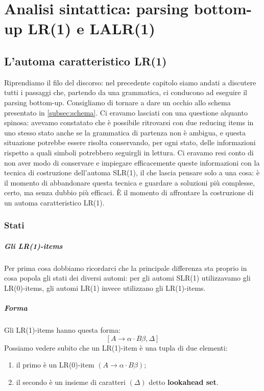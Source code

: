 \documentclass[class=book, crop=false, oneside, 12pt]{standalone}
\begin{document}
\chapter[Parsing bottom-up: LR(1) e LALR(1)]{Analisi sintattica: parsing bottom-up LR(1) e LALR(1)}

\section{L'automa caratteristico LR(1)}
Riprendiamo il filo del discorso: nel precedente capitolo siamo andati a discutere tutti i passaggi che, partendo da una grammatica, ci conducono ad eseguire il parsing bottom-up. Consigliamo di tornare a dare un occhio allo schema presentato in \autoref{subsec:schema}. Ci eravamo lasciati con una questione alquanto spinosa: avevamo constatato che è possibile ritrovarsi con due reducing items in uno stesso stato anche se la grammatica di partenza non è ambigua, e questa situazione potrebbe essere risolta conservando, per ogni stato, delle informazioni rispetto a quali simboli potrebbero seguirgli in lettura. Ci eravamo resi conto di non aver modo di conservare e impiegare efficacemente queste informazioni con la tecnica di costruzione dell'automa SLR(1), il che lascia pensare solo a una cosa: è il momento di abbandonare questa tecnica e guardare a soluzioni più complesse, certo, ma senza dubbio più efficaci. È il momento di affrontare la costruzione di un automa caratteristico LR(1).
\subsection{Stati}
\paragraph{Gli LR(1)-items}
Per prima cosa dobbiamo ricordarci che la principale differenza sta proprio in cosa popola gli stati dei diversi automi: per gli automi SLR(1) utilizzavamo gli LR(0)-items, gli automi LR(1) invece utilizzano gli LR(1)-items.
\paragraph{Forma}
Gli LR(1)-items hanno questa forma:
\begin{equation}
    \label{lr0}
    [A \to \alpha \cdot B \beta, \Delta]
\end{equation}
Possiamo vedere subito che un LR(1)-item è una tupla di due elementi:
\begin{enumerate}
    \item il primo è un LR(0)-item \((A \to \alpha \cdot B \beta)\);
    \item il secondo è un insieme di caratteri \((\Delta)\) detto \textbf{lookahead set}.
\end{enumerate}
\end{document}
